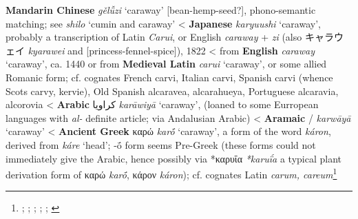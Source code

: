 \begin{etymology}\label{ety:geluzi}
\textbf{Mandarin Chinese}  \textit{gě​lǚ​zi} `caraway' [bean-hemp-seed?], phono-semantic matching; see \textit{shilo} `cumin and caraway'
< \textbf{Japanese}  \textit{karyuushi} `caraway', probably a transcription of Latin \textit{Carui}, or English \textit{caraway} + \textit{zi} (also キャラウェイ \textit{kyarawei} and  [princess-fennel-spice]), 1822
< from \textbf{English} \textit{caraway} `caraway', ca. 1440
 or from \textbf{Medieval Latin} \textit{carui} `caraway', or some allied Romanic form; cf. cognates French carvi, Italian carvi, Spanish carvi (whence Scots carvy, kervie), Old Spanish alcaravea, alcarahueya, Portuguese alcaravia, alcorovia
< \textbf{Arabic} {كراويا} \textit{karāwiyā} `caraway', (loaned to some Eurropean languages with \textit{al-} definite article; via Andalusian Arabic)
< \textbf{Aramaic} {/} \textit{karwāyā} `caraway'
< \textbf{Ancient Greek} {καρώ} \textit{karṓ} `caraway', a form of the word \textit{káron}, derived from \textit{káre} `head'; -ṓ form seems Pre-Greek (these forms could not immediately give the Arabic, hence possibly via *καρυΐα \textit{*karuḯa} a typical plant derivation form of καρώ \textit{karṓ}, κάρον \textit{káron}); cf. cognates Latin \textit{carum, careum}\footnote{\textcite[100]{kleeman_oxford_2010}; \textcite[s.v. caraway]{oed}; \textcite[s.v. caraway]{ahd}; \textcite[74]{corriente_dictionary_2008}; \textcites[207]{low_aramaeische_1881}[437-438]{low_flora_1924}; \textcites[653]{beekes_etymological_2010}[599]{sokoloff_dictionary_2002}}
\end{etymology}